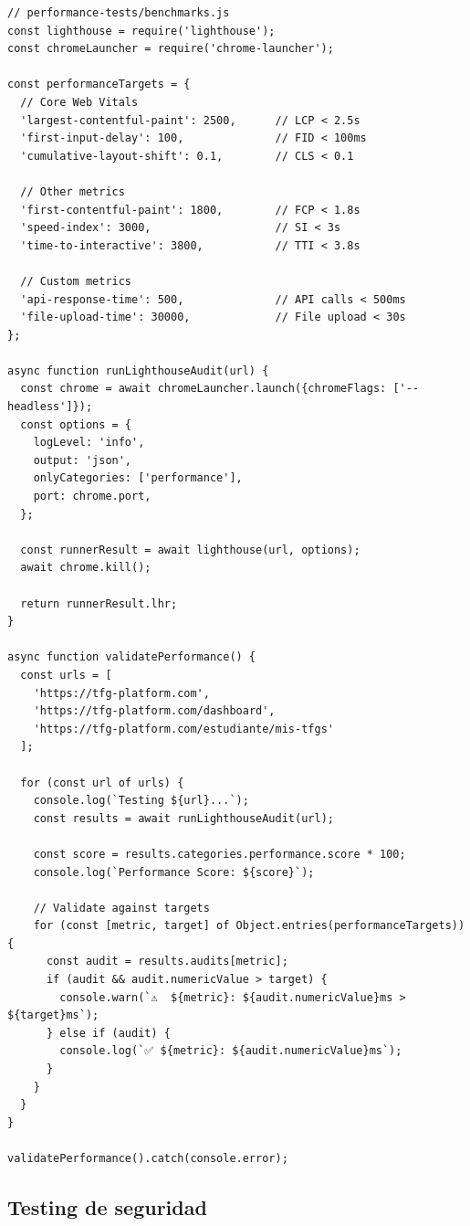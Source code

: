 \documentclass[12pt,a4paper,oneside]{report}
\begin{document}
\begin{lstlisting}
// performance-tests/benchmarks.js
const lighthouse = require('lighthouse');
const chromeLauncher = require('chrome-launcher');

const performanceTargets = {
  // Core Web Vitals
  'largest-contentful-paint': 2500,      // LCP < 2.5s
  'first-input-delay': 100,              // FID < 100ms  
  'cumulative-layout-shift': 0.1,        // CLS < 0.1

  // Other metrics
  'first-contentful-paint': 1800,        // FCP < 1.8s
  'speed-index': 3000,                   // SI < 3s
  'time-to-interactive': 3800,           // TTI < 3.8s

  // Custom metrics
  'api-response-time': 500,              // API calls < 500ms
  'file-upload-time': 30000,             // File upload < 30s
};

async function runLighthouseAudit(url) {
  const chrome = await chromeLauncher.launch({chromeFlags: ['--headless']});
  const options = {
    logLevel: 'info',
    output: 'json',
    onlyCategories: ['performance'],
    port: chrome.port,
  };

  const runnerResult = await lighthouse(url, options);
  await chrome.kill();

  return runnerResult.lhr;
}

async function validatePerformance() {
  const urls = [
    'https://tfg-platform.com',
    'https://tfg-platform.com/dashboard',
    'https://tfg-platform.com/estudiante/mis-tfgs'
  ];

  for (const url of urls) {
    console.log(`Testing ${url}...`);
    const results = await runLighthouseAudit(url);
    
    const score = results.categories.performance.score * 100;
    console.log(`Performance Score: ${score}`);
    
    // Validate against targets
    for (const [metric, target] of Object.entries(performanceTargets)) {
      const audit = results.audits[metric];
      if (audit && audit.numericValue > target) {
        console.warn(`⚠️  ${metric}: ${audit.numericValue}ms > ${target}ms`);
      } else if (audit) {
        console.log(`✅ ${metric}: ${audit.numericValue}ms`);
      }
    }
  }
}

validatePerformance().catch(console.error);
\end{lstlisting}

\subsection{Testing de seguridad}\label{testing-de-seguridad}
\end{document}
